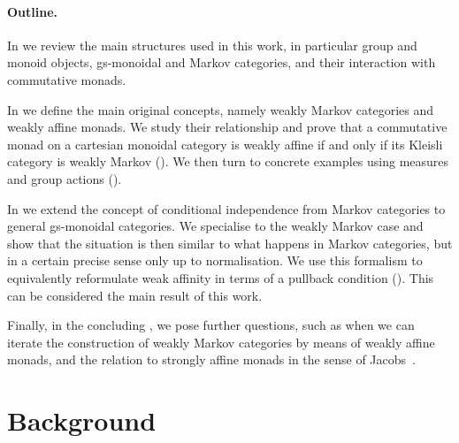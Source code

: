 \documentclass[a4paper,UKenglish,numberwithinsect,cleveref, autoref, thm-restate]{lipics-v2021}
\theoremstyle{plain} %
\theoremstyle{definition} %
\begin{document}
\paragraph*{Outline.}
In  we review the main structures used in this work, in particular group and monoid objects, gs-monoidal and Markov categories, and their interaction with commutative monads.

In  we define the main original concepts, namely weakly Markov categories and weakly affine monads. We study their relationship and prove that a commutative monad on a cartesian monoidal category is weakly affine if and only if its Kleisli category is weakly Markov ().
We then turn to concrete examples using measures and group actions ().

In  we extend the concept of conditional independence from Markov categories to general gs-monoidal categories. We specialise to the weakly Markov case and show that the situation is then similar to what happens in Markov categories, but in a certain precise sense only up to normalisation.
We use this formalism to equivalently reformulate weak affinity in terms of a pullback condition (). This can be considered the main result of this work.

Finally, in the concluding , we pose further questions, such as when we can iterate the construction of weakly Markov categories by means of weakly affine monads, and the relation to strongly affine monads in the sense of Jacobs~\cite{Jacobs16}.


\section{Background}
\label{secbackground}
\end{document}
